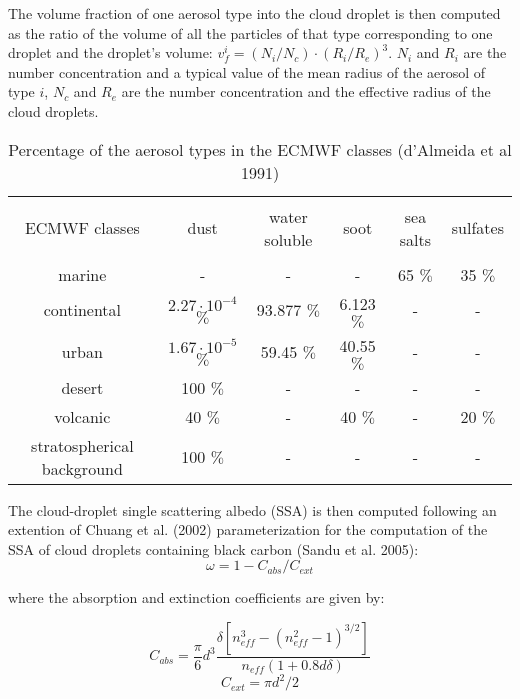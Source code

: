 The volume fraction of one aerosol type into the cloud droplet is then computed as the ratio of the volume of all the particles of that type corresponding to one droplet and the droplet's volume: $v_f^i=(N_i/N_c)\cdot (R_i/R_e)^3$. $N_i$ and $R_i$ are the number concentration and a typical value of the mean radius of the aerosol of type $i$, $N_c$ and $R_e$ are the number concentration and the effective radius of the cloud droplets. 

\bigskip

\begin{table}[!ht]
\caption{Percentage of the aerosol types in the ECMWF classes (d'Almeida et al 1991)}
\begin{center}
\begin{tabular}{|c|c|c|c|c|c|}
   \hline
     &   &   &  &  &    \\
      ECMWF classes & dust & water soluble & soot & sea salts & sulfates  \\
     &   &   &  &  &    \\
   \hline
   \hline
marine & -  &  -   &  -   &  65 $\%$   & 35  $\%$        \\
  \hline
continental & $2.27\cdot 10^{-4}$  $\%$  & 93.877 $\%$    &  6.123  $\%$   & -   & -    \\
  \hline
urban & $1.67\cdot 10^{-5}$ $\%$   & 59.45  $\%$   &  40.55  $\%$   & -   & -    \\
  \hline
desert & 100  $\%$  & -   &  -   & -   & -    \\
  \hline
volcanic & 40  $\%$  & -   &  40  $\%$   & -   & 20  $\%$    \\
  \hline
stratospherical background & 100  $\%$  & -   &  -   & -   & -    \\
  \hline
\end{tabular} 
\end{center}
\end{table} 
\bigskip

The cloud-droplet single scattering albedo (SSA) is then computed following an extention of Chuang et al. (2002) parameterization for the computation of the SSA of cloud droplets containing black carbon (Sandu et al. 2005):
$$\omega = 1- C_{abs}/C_{ext}$$

where the absorption and extinction coefficients are given by:

\begin{equation}
 C_{abs}=\frac{\pi}{6}d^3\frac{\delta[n_{eff}^3-(n_{eff}^2-1)^{3/2}]}{n_{eff} (1+0.8d \delta)}\nonumber
 \end{equation}
\begin{equation}
C_{ext}=\pi d^2 /2
 \end{equation}

